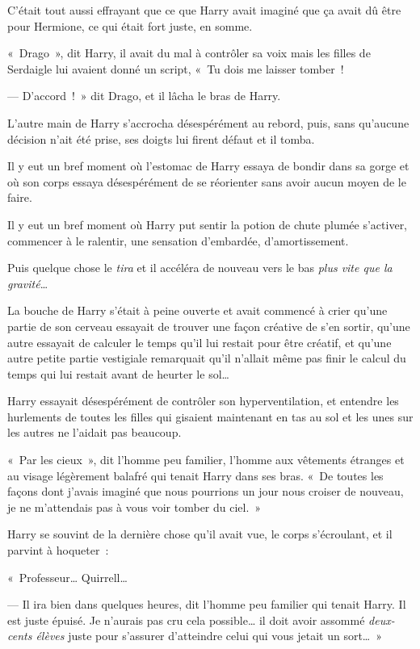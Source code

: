 C'était tout aussi effrayant que ce que Harry avait imaginé que ça avait dû être pour Hermione, ce qui était fort juste, en somme.

«~Drago~», dit Harry, il avait du mal à contrôler sa voix mais les filles de Serdaigle lui avaient donné un script, «~Tu dois me laisser tomber~!

--- D'accord~!~» dit Drago, et il lâcha le bras de Harry.

L'autre main de Harry s'accrocha désespérément au rebord, puis, sans qu'aucune décision n'ait été prise, ses doigts lui firent défaut et il tomba.

Il y eut un bref moment où l'estomac de Harry essaya de bondir dans sa gorge et où son corps essaya désespérément de se réorienter sans avoir aucun moyen de le faire.

Il y eut un bref moment où Harry put sentir la potion de chute plumée s'activer, commencer à le ralentir, une sensation d'embardée, d'amortissement.

Puis quelque chose le \emph{tira} et il accéléra de nouveau vers le bas \emph{plus vite que la gravité}…

La bouche de Harry s'était à peine ouverte et avait commencé à crier qu'une partie de son cerveau essayait de trouver une façon créative de s'en sortir, qu'une autre essayait de calculer le temps qu'il lui restait pour être créatif, et qu'une autre petite partie vestigiale remarquait qu'il n'allait même pas finir le calcul du temps qui lui restait avant de heurter le sol…

\later

Harry essayait désespérément de contrôler son hyperventilation, et entendre les hurlements de toutes les filles qui gisaient maintenant en tas au sol et les unes sur les autres ne l'aidait pas beaucoup.

«~Par les cieux~», dit l'homme peu familier, l'homme aux vêtements étranges et au visage légèrement balafré qui tenait Harry dans ses bras. «~De toutes les façons dont j'avais imaginé que nous pourrions un jour nous croiser de nouveau, je ne m'attendais pas à vous voir tomber du ciel.~»

Harry se souvint de la dernière chose qu'il avait vue, le corps s'écroulant, et il parvint à hoqueter~:

«~Professeur… Quirrell…

--- Il ira bien dans quelques heures, dit l'homme peu familier qui tenait Harry. Il est juste épuisé. Je n'aurais pas cru cela possible… il doit avoir assommé \emph{deux-cents élèves} juste pour s'assurer d'atteindre celui qui vous jetait un sort…~»

